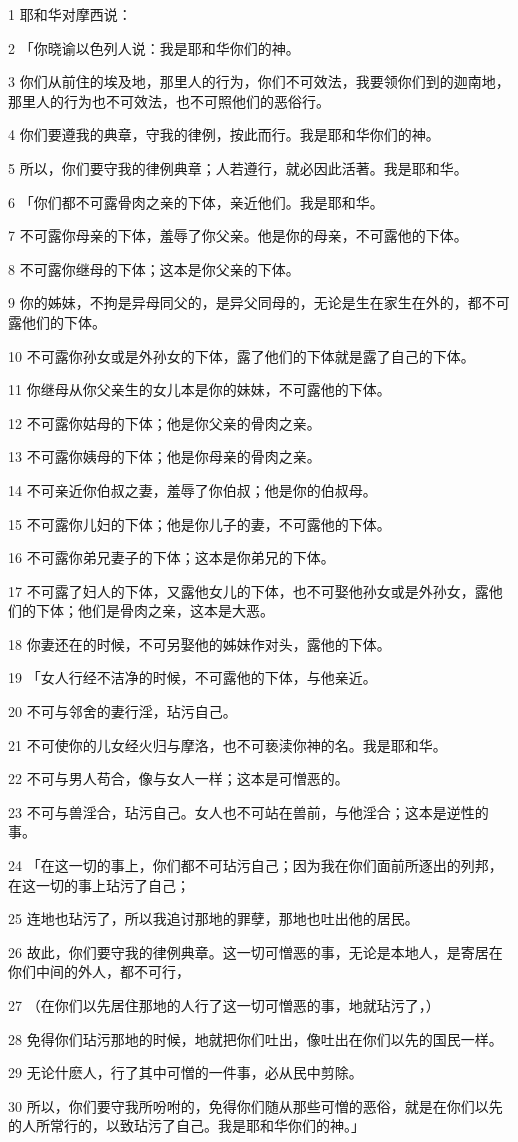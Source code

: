 \par 1 耶和华对摩西说：
\par 2 「你晓谕以色列人说：我是耶和华你们的神。
\par 3 你们从前住的埃及地，那里人的行为，你们不可效法，我要领你们到的迦南地，那里人的行为也不可效法，也不可照他们的恶俗行。
\par 4 你们要遵我的典章，守我的律例，按此而行。我是耶和华你们的神。
\par 5 所以，你们要守我的律例典章；人若遵行，就必因此活著。我是耶和华。
\par 6 「你们都不可露骨肉之亲的下体，亲近他们。我是耶和华。
\par 7 不可露你母亲的下体，羞辱了你父亲。他是你的母亲，不可露他的下体。
\par 8 不可露你继母的下体；这本是你父亲的下体。
\par 9 你的姊妹，不拘是异母同父的，是异父同母的，无论是生在家生在外的，都不可露他们的下体。
\par 10 不可露你孙女或是外孙女的下体，露了他们的下体就是露了自己的下体。
\par 11 你继母从你父亲生的女儿本是你的妹妹，不可露他的下体。
\par 12 不可露你姑母的下体；他是你父亲的骨肉之亲。
\par 13 不可露你姨母的下体；他是你母亲的骨肉之亲。
\par 14 不可亲近你伯叔之妻，羞辱了你伯叔；他是你的伯叔母。
\par 15 不可露你儿妇的下体；他是你儿子的妻，不可露他的下体。
\par 16 不可露你弟兄妻子的下体；这本是你弟兄的下体。
\par 17 不可露了妇人的下体，又露他女儿的下体，也不可娶他孙女或是外孙女，露他们的下体；他们是骨肉之亲，这本是大恶。
\par 18 你妻还在的时候，不可另娶他的姊妹作对头，露他的下体。
\par 19 「女人行经不洁净的时候，不可露他的下体，与他亲近。
\par 20 不可与邻舍的妻行淫，玷污自己。
\par 21 不可使你的儿女经火归与摩洛，也不可亵渎你神的名。我是耶和华。
\par 22 不可与男人苟合，像与女人一样；这本是可憎恶的。
\par 23 不可与兽淫合，玷污自己。女人也不可站在兽前，与他淫合；这本是逆性的事。
\par 24 「在这一切的事上，你们都不可玷污自己；因为我在你们面前所逐出的列邦，在这一切的事上玷污了自己；
\par 25 连地也玷污了，所以我追讨那地的罪孽，那地也吐出他的居民。
\par 26 故此，你们要守我的律例典章。这一切可憎恶的事，无论是本地人，是寄居在你们中间的外人，都不可行，
\par 27 （在你们以先居住那地的人行了这一切可憎恶的事，地就玷污了，）
\par 28 免得你们玷污那地的时候，地就把你们吐出，像吐出在你们以先的国民一样。
\par 29 无论什麽人，行了其中可憎的一件事，必从民中剪除。
\par 30 所以，你们要守我所吩咐的，免得你们随从那些可憎的恶俗，就是在你们以先的人所常行的，以致玷污了自己。我是耶和华你们的神。」

